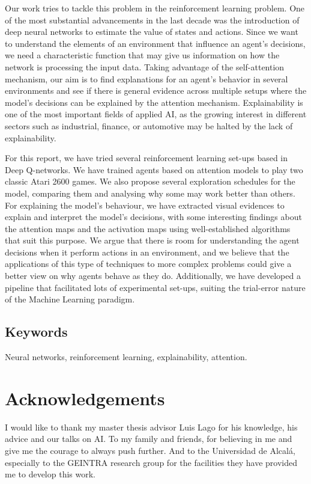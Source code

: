 Our work tries to tackle this problem in the reinforcement learning problem. One of the most substantial advancements in the last decade was the introduction of deep neural networks to estimate the value of states and actions. Since we want to understand the elements of an environment that influence an agent's decisions, we need a characteristic function that may give us information on how the network is processing the input data. Taking advantage of the self-attention mechanism, our aim is to find explanations for an agent's behavior in several environments and see if there is general evidence across multiple setups where the model's decisions can be explained by the attention mechanism. Explainability is one of the most important fields of applied AI, as the growing interest in different sectors such as industrial, finance, or automotive may be halted by the lack of explainability.

For this report, we have tried several reinforcement learning set-ups based in Deep Q-networks. We have trained agents based on attention models to play two classic Atari 2600 games. We also propose several exploration schedules for the model, comparing them and analysing why some may work better than others. For explaining the model's behaviour, we have extracted visual evidences to explain and interpret the model's decisions, with some interesting findings about the attention maps and the activation maps using well-established algorithms that suit this purpose. We argue that there is room for understanding the agent decisions when it perform actions in an environment, and we believe that the applications of this type of techniques to more complex problems could give a better view on why agents behave as they do. Additionally, we have developed a pipeline that facilitated lots of experimental set-ups, suiting the trial-error nature of the Machine Learning paradigm.

\vfill
\section*{Keywords}
Neural networks, reinforcement learning, explainability, attention.

\newpage
\chapter*{Acknowledgements}
I would like to thank my master thesis advisor Luis Lago for his knowledge, his advice and our talks on AI. To my family and friends, for believing in me and give me the courage to always push further. And to the Universidad de Alcalá, especially to the GEINTRA research group for the facilities they have provided me to develop this work.